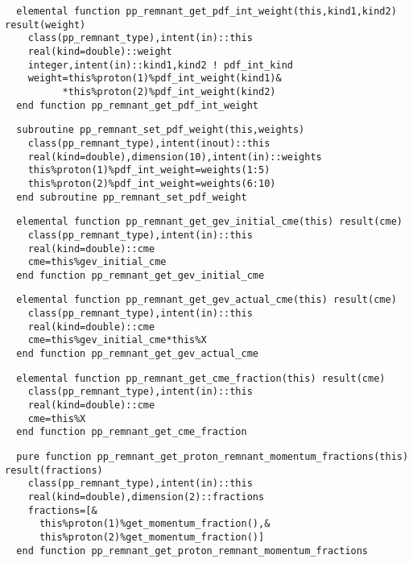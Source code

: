 \begin{Verbatim}
  elemental function pp_remnant_get_pdf_int_weight(this,kind1,kind2) result(weight)
    class(pp_remnant_type),intent(in)::this
    real(kind=double)::weight
    integer,intent(in)::kind1,kind2 ! pdf_int_kind
    weight=this%proton(1)%pdf_int_weight(kind1)&
          *this%proton(2)%pdf_int_weight(kind2)
  end function pp_remnant_get_pdf_int_weight
\end{Verbatim}

\begin{Verbatim}
  subroutine pp_remnant_set_pdf_weight(this,weights)
    class(pp_remnant_type),intent(inout)::this
    real(kind=double),dimension(10),intent(in)::weights
    this%proton(1)%pdf_int_weight=weights(1:5)
    this%proton(2)%pdf_int_weight=weights(6:10)
  end subroutine pp_remnant_set_pdf_weight
\end{Verbatim}

\begin{Verbatim}
  elemental function pp_remnant_get_gev_initial_cme(this) result(cme)
    class(pp_remnant_type),intent(in)::this
    real(kind=double)::cme
    cme=this%gev_initial_cme
  end function pp_remnant_get_gev_initial_cme
\end{Verbatim}

\begin{Verbatim}
  elemental function pp_remnant_get_gev_actual_cme(this) result(cme)
    class(pp_remnant_type),intent(in)::this
    real(kind=double)::cme
    cme=this%gev_initial_cme*this%X
  end function pp_remnant_get_gev_actual_cme
\end{Verbatim}

\begin{Verbatim}
  elemental function pp_remnant_get_cme_fraction(this) result(cme)
    class(pp_remnant_type),intent(in)::this
    real(kind=double)::cme
    cme=this%X
  end function pp_remnant_get_cme_fraction
\end{Verbatim}

\begin{Verbatim}
  pure function pp_remnant_get_proton_remnant_momentum_fractions(this) result(fractions)
    class(pp_remnant_type),intent(in)::this
    real(kind=double),dimension(2)::fractions
    fractions=[&
      this%proton(1)%get_momentum_fraction(),&
      this%proton(2)%get_momentum_fraction()]
  end function pp_remnant_get_proton_remnant_momentum_fractions
\end{Verbatim}

